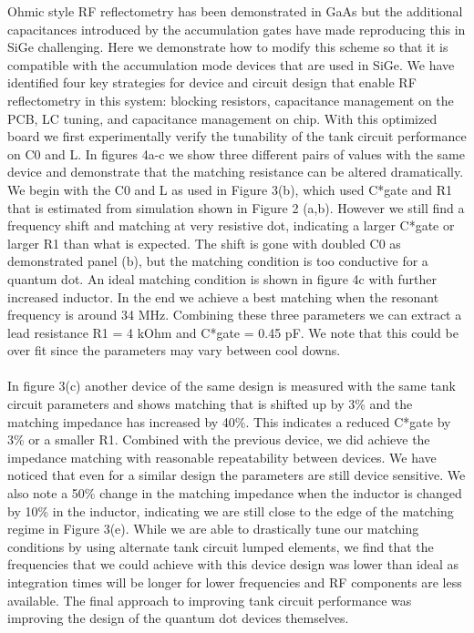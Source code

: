\documentclass{article}
\begin{document}
	Ohmic style RF reflectometry has been demonstrated in GaAs but the additional capacitances introduced by the accumulation gates have made reproducing this in SiGe challenging.  Here we demonstrate how to modify this scheme so that it is compatible with the accumulation mode devices that are used in SiGe.  We have identified four key strategies for device and circuit design that enable RF reflectometry in this system: blocking resistors, capacitance management on the PCB, LC tuning, and capacitance management on chip.  
	With this optimized board we first experimentally verify the tunability of the tank circuit performance on C0 and L. In figures 4a-c we show three different pairs of values with the same device and demonstrate that the matching resistance can be altered dramatically. We begin with the C0 and L as used in Figure 3(b), which used C*gate and R1 that is estimated from simulation shown in Figure 2 (a,b).  However we still find a frequency shift and matching at very resistive dot, indicating a larger C*gate or larger R1 than what is expected. The shift is gone with doubled C0 as demonstrated panel (b), but the matching condition is too conductive for a quantum dot. An ideal matching condition is shown in figure 4c with further increased inductor. In the end we achieve a best matching when the resonant frequency is around 34 MHz. Combining these three parameters we can extract a lead resistance R1 = 4 kOhm and C*gate = 0.45 pF. We note that this could be over fit since the parameters may vary between cool downs. 
	\\ \\
	In figure 3(c) another device of the same design is measured with the same tank circuit parameters and shows matching that is shifted up by 3\% and the matching impedance has increased by 40\%. This indicates a reduced C*gate by 3\% or a smaller R1.  Combined with the previous device, we did achieve the impedance matching with reasonable repeatability between devices.  We have noticed that even for a similar design the parameters are still device sensitive. We also note a 50\% change in the matching impedance when the inductor is changed by 10\% in the inductor, indicating we are still close to the edge of the matching regime in Figure 3(e). While we are able to drastically tune our matching conditions by using alternate tank circuit lumped elements, we find that the frequencies that we could achieve with this device design was lower than ideal as integration times will be longer for lower frequencies and RF components are less available. The final approach to improving tank circuit performance was improving the design of the quantum dot devices themselves.  
\end{document}
